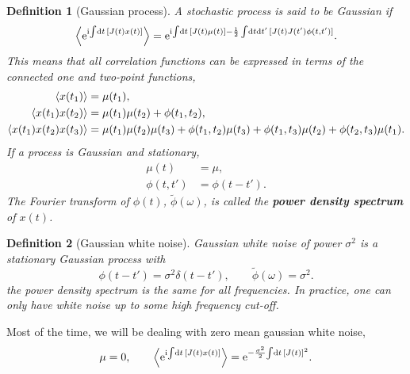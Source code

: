 \documentclass[12pt]{article}
\theoremstyle{slplain}
\theoremstyle{sldefinition}
\newtheorem{defn}{Definition}
\theoremstyle{remark}
\begin{document}
\begin{defn}[Gaussian process]
  A stochastic process is said to be Gaussian if
  \begin{equation}\label{eq:gaussproc}
    \left\langle \mathrm{e}^{\mathrm{i}\!\int\!\mathrm{d} t\, [J(t) x(t)]} \right\rangle = \mathrm{e}^{\mathrm{i}\!\int\!\mathrm{d} t\, [J(t)\mu(t)] - \frac{1}{2}\int\!\mathrm{d} t\mathrm{d} t'\, [J(t)J(t')\phi(t,t')]}.
  \end{equation}
  This means that all correlation functions can be expressed in terms of the connected one and two-point functions, \eg
  \begin{equation}\label{eq:gaussmom}
    \begin{aligned}
      \left\langle x(t_1) \right\rangle &= \mu(t_1), \\
      \left\langle x(t_1)x(t_2) \right\rangle  &= \mu(t_1)\mu(t_2) + \phi(t_1,t_2), \\
      \left\langle x(t_1)x(t_2)x(t_3) \right\rangle  &= \mu(t_1)\mu(t_2)\mu(t_3) + \phi(t_1,t_2)\mu(t_3) + \phi(t_1,t_3)\mu(t_2) + \phi(t_2,t_3)\mu(t_1).
    \end{aligned}
  \end{equation}
  If a process is Gaussian and stationary,
  \begin{equation}\label{eq:statgauss}
    \begin{aligned}
      \mu(t) &= \mu, \\
      \phi(t,t')  &= \phi(t-t').
    \end{aligned}
  \end{equation}
  The Fourier transform of $\phi(t)$, $\tilde{\phi}(\omega)$, is called the \textbf{power density spectrum} of $x(t)$.
\end{defn}

\begin{defn}[Gaussian white noise]
  Gaussian white noise of power $\sigma^2$ is a stationary Gaussian process with
  \begin{equation}\label{eq:gaussianwhite}
    \phi(t-t') = \sigma^2\delta(t-t'), \qquad
    \tilde{\phi}(\omega) = \sigma^2.
  \end{equation}
  \ie the power density spectrum is the same for all frequencies. In practice, one can only have white noise up to some high frequency cut-off.
\end{defn}

Most of the time, we will be dealing with zero mean gaussian white noise, \ie
%
\begin{equation}\label{eq:zeromeanwhite}
  \mu=0, \qquad
  \left\langle \mathrm{e}^{\mathrm{i}\!\int\!\mathrm{d} t\, [J(t) x(t)]} \right\rangle = \mathrm{e}^{-\frac{\sigma^2}{2}\!\int\!\mathrm{d} t\, [J(t)]^2}.
\end{equation}
%
\end{document}
